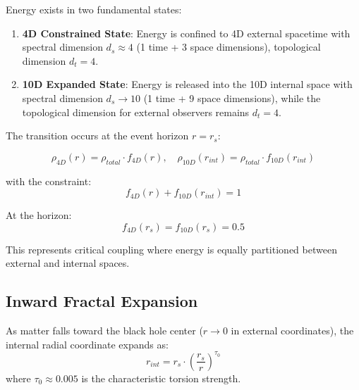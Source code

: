 \begin{axiom}
Energy exists in two fundamental states:
\begin{enumerate}
    \item \textbf{4D Constrained State}: Energy is confined to 4D external spacetime with spectral dimension $d_s \approx 4$ (1 time + 3 space dimensions), topological dimension $d_t = 4$.
    \item \textbf{10D Expanded State}: Energy is released into the 10D internal space with spectral dimension $d_s \to 10$ (1 time + 9 space dimensions), while the topological dimension for external observers remains $d_t = 4$.
\end{enumerate}
\end{axiom}

The transition occurs at the event horizon $r = r_s$:

\begin{equation}
    \rho_{4D}(r) = \rho_{total} \cdot f_{4D}(r), \quad \rho_{10D}(r_{int}) = \rho_{total} \cdot f_{10D}(r_{int})
\end{equation}

with the constraint:
\begin{equation}
    f_{4D}(r) + f_{10D}(r_{int}) = 1
\end{equation}

At the horizon:
\begin{equation}
    f_{4D}(r_s) = f_{10D}(r_s) = 0.5
    \label{eq:horizon_energy_equipartition}
\end{equation}

This represents critical coupling where energy is equally partitioned between external and internal spaces.

\subsection{Inward Fractal Expansion}

\begin{theorem}
As matter falls toward the black hole center ($r \to 0$ in external coordinates), the internal radial coordinate expands as:
\begin{equation}
    r_{int} = r_s \cdot \left(\frac{r_s}{r}\right)^{\tau_0}
    \label{eq:internal_expansion}
\end{equation}
where $\tau_0 \approx 0.005$ is the characteristic torsion strength.
\end{theorem}

